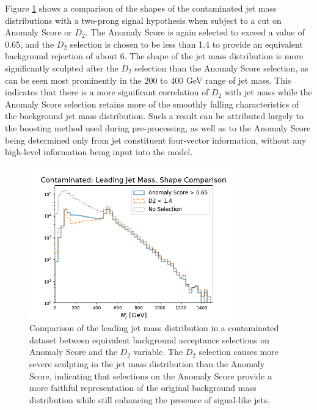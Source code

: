 \documentclass[11pt, a4paper]{article}
\begin{document}
Figure \ref{fig:d2_comp} shows a comparison of the shapes of the contaminated jet mass distributions with a two-prong signal hypothesis when subject to a cut on Anomaly Score or $D_2$. The Anomaly Score is again selected to exceed a value of 0.65, and the $D_2$ selection is chosen to be less than 1.4 to provide an equivalent background rejection of about 6. The shape of the jet mass distribution is more significantly sculpted after the $D_2$ selection than the Anomaly Score selection, as can be seen most prominently in the 200 to 400 GeV range of jet mass. This indicates that there is a more significant correlation of $D_2$ with jet mass while the Anomaly Score selection retains more of the smoothly falling characteristics of the background jet mass distribution. Such a result can be attributed largely to the boosting method used during pre-processing, as well as to the Anomaly Score being determined only from jet constituent four-vector information, without any high-level information being input into the model. 

\begin{figure}[H]
	\begin{center}
		\includegraphics[width=250pt]{imgs/bugfix/2Prong_Contaminated_10p0_J_Mass_EventScore0p65_Multi_D2Comp_Lead_SaveForPaper.png}
	\end{center}
	\caption{Comparison of the leading jet mass distribution in a contaminated dataset between equivalent background acceptance selections on Anomaly Score and the $D_2$ variable. The $D_2$ selection causes more severe sculpting in the jet mass distribution than the Anomaly Score, indicating that selections on the Anomaly Score provide a more faithful representation of the original background mass distribution while still enhancing the presence of signal-like jets.}
	\label{fig:d2_comp}
\end{figure}
\end{document}
